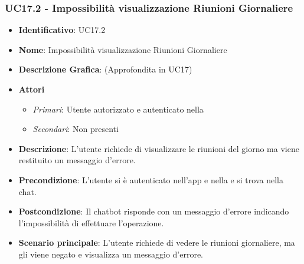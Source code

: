 \subsubsection{UC17.2 - Impossibilità visualizzazione Riunioni Giornaliere }
\begin{itemize}
	\item \textbf{Identificativo}: UC17.2
	\item \textbf{Nome}: Impossibilità visualizzazione Riunioni Giornaliere
	\item\textbf{Descrizione Grafica}: (Approfondita in UC17)
	\item \textbf{Attori}
	\begin{itemize} 
		\item \textit{Primari}: Utente autorizzato e autenticato nella 
		\item \textit{Secondari}: Non presenti
	\end{itemize}
	\item \textbf{Descrizione}: L'utente richiede di visualizzare le riunioni del giorno ma viene restituito un messaggio d'errore.
	\item \textbf{Precondizione}: L'utente si è autenticato nell'app e nella  e si trova nella chat.
	\item \textbf{Postcondizione}: Il chatbot risponde con un messaggio d'errore indicando l'impossibilità di effettuare l'operazione.
	\item \textbf{Scenario principale}: L'utente richiede di vedere le riunioni giornaliere, ma gli viene negato e visualizza un messaggio d'errore.
\end{itemize}